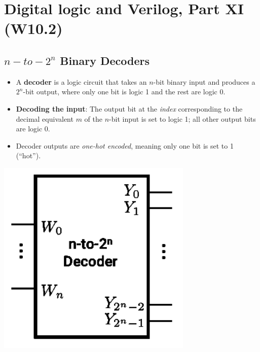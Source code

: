 \documentclass[12pt,openany]{book}
\begin{document}
\chapter{Digital logic and Verilog, Part XI (W10.2)}

\section{$n-to-2^{n}$ Binary Decoders}

\begin{minipage}{0.45\textwidth}
	\begin{itemize}
		\item[] A \textbf{decoder} is a logic circuit that takes an $n$-bit binary input and produces a $2^n$-bit output, where only one bit is logic 1 and the rest are logic 0.
		\item[] \textbf{Decoding the input}: The output bit at the \textit{index} corresponding to the decimal equivalent $m$ of the $n$-bit input is set to logic 1; all other output bits are logic 0.
		\item[] Decoder outputs are \textit{one-hot encoded}, meaning only one bit is set to 1 (``hot'').
	\end{itemize}
	
\end{minipage}
\hfill
\vline
\hfill
\begin{minipage}
	{0.45\textwidth}
	\includegraphics[width=0.7\textwidth]{circuits/16.1.png}
\end{minipage}\newline
\vspace*{-10px}
\end{document}
